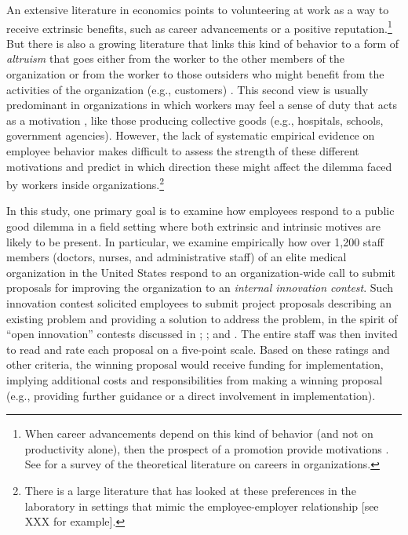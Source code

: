 \documentclass[11pt, titlepage]{article}
\begin{document}
An extensive literature in economics points to volunteering at work as a
way to receive extrinsic benefits, such as career advancements or a
positive reputation.\footnote{When career advancements depend on this
  kind of behavior (and not on productivity alone), then the prospect of
  a promotion provide motivations \citep{kreps1997intrinsic}. See
  \citet{gibbons1999careers} for a survey of the theoretical literature
  on careers in organizations.} But there is also a growing literature
that links this kind of behavior to a form of \emph{altruism} that goes
either from the worker to the other members of the organization
\citep{bandiera2005social, rotemberg2006altruism} or from the worker to
those outsiders who might benefit from the activities of the
organization (e.g., customers)
\citep{delfgaauw2005dedicated, delfgaauw2008incentives, prendergast2007motivation}.
This second view is usually predominant in organizations in which
workers may feel a sense of duty that acts as a motivation
\citep{akerlof2005identity, besley2005competition}, like those producing
collective goods (e.g., hospitals, schools, government agencies).
However, the lack of systematic empirical evidence on employee behavior
makes difficult to assess the strength of these different motivations
and predict in which direction these might affect the dilemma faced by
workers inside organizations.\footnote{There is a large literature that
  has looked at these preferences in the laboratory in settings that
  mimic the employee-employer relationship {[}see XXX for example{]}.}

In this study, one primary goal is to examine how employees respond to a
public good dilemma in a field setting where both extrinsic and
intrinsic motives are likely to be present. In particular, we examine
empirically how over 1,200 staff members (doctors, nurses, and
administrative staff) of an elite medical organization in the United
States respond to an organization-wide call to submit proposals for
improving the organization to an \emph{internal innovation contest}.
Such innovation contest solicited employees to submit project proposals
describing an existing problem and providing a solution to address the
problem, in the spirit of ``open innovation'' contests discussed in
\citet{terwiesch2008innovation}; \citet{lakhani2013prize}; and
\citet{glaeser2016predictive}. The entire staff was then invited to read
and rate each proposal on a five-point scale. Based on these ratings and
other criteria, the winning proposal would receive funding for
implementation, implying additional costs and responsibilities from
making a winning proposal (e.g., providing further guidance or a direct
involvement in implementation).
\end{document}
